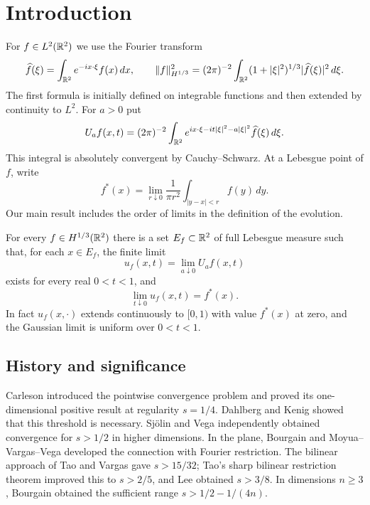 \section{Introduction}\label{sec:introduction}
For $f\in L^2(\mathbb R^2)$ we use the Fourier transform
\[
\widehat f(\xi)=\int_{\mathbb R^2}e^{-ix\cdot\xi}f(x)\,dx,
\qquad
\|f\|_{H^{1/3}}^2=(2\pi)^{-2}\int_{\mathbb R^2}
 (1+|\xi|^2)^{1/3}|\widehat f(\xi)|^2\,d\xi.
\]
The first formula is initially defined on integrable functions and then
extended by continuity to $L^2$. For $a>0$ put
\begin{equation}\label{eq:intro-abel}
 U_af(x,t)=(2\pi)^{-2}\int_{\mathbb R^2}
 e^{ix\cdot\xi-it|\xi|^2-a|\xi|^2}\widehat f(\xi)\,d\xi.
\end{equation}
This integral is absolutely convergent by Cauchy--Schwarz. At a Lebesgue
point of $f$, write
\[
 f^*(x)=\lim_{r\downarrow0}\frac1{\pi r^2}
                    \int_{|y-x|<r}f(y)\,dy.
\]
Our main result includes the order of limits in the definition of the
evolution.
\begin{theorem}\label{thm:main}
For every $f\in H^{1/3}(\mathbb R^2)$ there is a set $E_f\subset\mathbb R^2$ of full
Lebesgue measure such that, for each $x\in E_f$, the finite limit
\[
 u_f(x,t)=\lim_{a\downarrow0}U_af(x,t)
\]
exists for every real $0<t<1$, and
\[
 \lim_{t\downarrow0}u_f(x,t)=f^*(x).
\]
In fact $u_f(x,\cdot)$ extends continuously to $[0,1)$ with value $f^*(x)$
at zero, and the Gaussian limit is uniform over $0<t<1$.
\end{theorem}

\subsection{History and significance}
Carleson \cite{Carleson80} introduced the pointwise convergence problem and
proved its one-dimensional positive result at regularity $s=1/4$.
Dahlberg and Kenig \cite{DahlbergKenig82} showed that this threshold is
necessary. Sj\"olin \cite{Sjolin87} and Vega \cite{Vega88} independently
obtained convergence for $s>1/2$ in higher dimensions. In the plane,
Bourgain and Moyua--Vargas--Vega
\cite{Bourgain95,MVV96} developed the connection with Fourier restriction.
The bilinear approach of Tao and Vargas \cite{TV00} gave $s>15/32$;
Tao's sharp bilinear restriction theorem \cite{Tao03} improved this to
$s>2/5$, and Lee \cite{Lee06} obtained $s>3/8$.
In dimensions $n\ge3$, Bourgain \cite{Bourgain13} obtained the sufficient
range $s>1/2-1/(4n)$.

